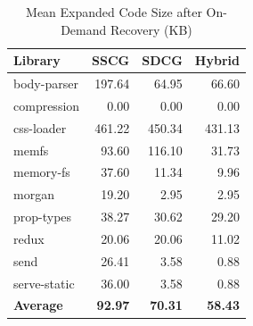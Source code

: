 \begin{table}[htbp]
\centering
\caption{Mean Expanded Code Size after On-Demand Recovery (KB)}
\label{tab:mecs}
\small
\setlength{\tabcolsep}{6pt}
\renewcommand{\arraystretch}{1.10}
\begin{tabular*}{0.77\linewidth}{@{\extracolsep{\fill}}lrrr@{}}
\toprule
Library & SSCG & SDCG & Hybrid \\
\midrule
body-parser & 197.64 & 64.95 & 66.60 \\
compression & 0.00 & 0.00 & 0.00 \\
css-loader & 461.22 & 450.34 & 431.13 \\
memfs & 93.60 & 116.10 & 31.73 \\
memory-fs & 37.60 & 11.34 & 9.96 \\
morgan & 19.20 & 2.95 & 2.95 \\
prop-types & 38.27 & 30.62 & 29.20 \\
redux & 20.06 & 20.06 & 11.02 \\
send & 26.41 & 3.58 & 0.88 \\
serve-static & 36.00 & 3.58 & 0.88 \\
\midrule
\textbf{Average} & \textbf{92.97} & \textbf{70.31} & \textbf{58.43} \\
\bottomrule
\end{tabular*}
\end{table}
